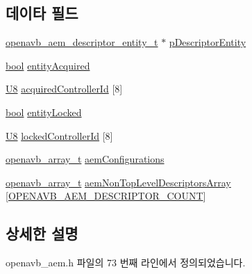 \subsection*{데이타 필드}
\begin{DoxyCompactItemize}
\item 
\hyperlink{structopenavb__aem__descriptor__entity__t}{openavb\+\_\+aem\+\_\+descriptor\+\_\+entity\+\_\+t} $\ast$ \hyperlink{structopenavb__avdecc__entity__model__t_a268a49d820d3f18d5c6476073fc6c521}{p\+Descriptor\+Entity}
\item 
\hyperlink{avb__gptp_8h_af6a258d8f3ee5206d682d799316314b1}{bool} \hyperlink{structopenavb__avdecc__entity__model__t_a532a1d34249f318aaba8a0d1245f9efe}{entity\+Acquired}
\item 
\hyperlink{openavb__types__base__pub_8h_aa63ef7b996d5487ce35a5a66601f3e73}{U8} \hyperlink{structopenavb__avdecc__entity__model__t_a312f690671ac3a5b605d5f30e4d4eb10}{acquired\+Controller\+Id} \mbox{[}8\mbox{]}
\item 
\hyperlink{avb__gptp_8h_af6a258d8f3ee5206d682d799316314b1}{bool} \hyperlink{structopenavb__avdecc__entity__model__t_af533b299babf99ee60ccfe8545236d40}{entity\+Locked}
\item 
\hyperlink{openavb__types__base__pub_8h_aa63ef7b996d5487ce35a5a66601f3e73}{U8} \hyperlink{structopenavb__avdecc__entity__model__t_ae53e6a29aadc9cee888d0af7d438b0a0}{locked\+Controller\+Id} \mbox{[}8\mbox{]}
\item 
\hyperlink{openavb__array_8h_a43e0de981c90a3d7c9ddeb67fbf2a54e}{openavb\+\_\+array\+\_\+t} \hyperlink{structopenavb__avdecc__entity__model__t_aa28999bbb101ba1c0aef9be5cfe4863f}{aem\+Configurations}
\item 
\hyperlink{openavb__array_8h_a43e0de981c90a3d7c9ddeb67fbf2a54e}{openavb\+\_\+array\+\_\+t} \hyperlink{structopenavb__avdecc__entity__model__t_ac6de70adc2a6966f6136a7c0b142515e}{aem\+Non\+Top\+Level\+Descriptors\+Array} \mbox{[}\hyperlink{openavb__aem__types__pub_8h_aa9f936b6eade681759b61f2a5e438137}{O\+P\+E\+N\+A\+V\+B\+\_\+\+A\+E\+M\+\_\+\+D\+E\+S\+C\+R\+I\+P\+T\+O\+R\+\_\+\+C\+O\+U\+NT}\mbox{]}
\end{DoxyCompactItemize}


\subsection{상세한 설명}


openavb\+\_\+aem.\+h 파일의 73 번째 라인에서 정의되었습니다.



